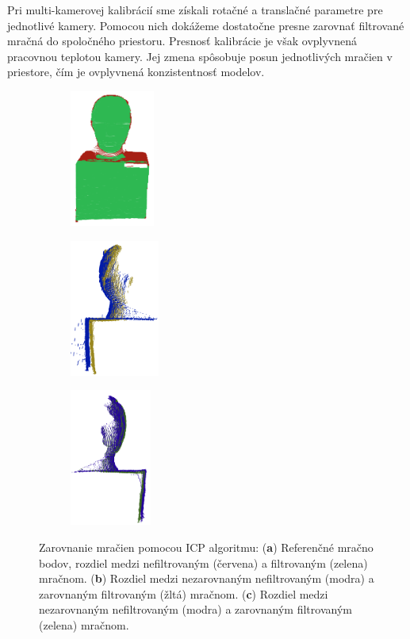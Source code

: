 Pri multi-kamerovej kalibrácií sme získali rotačné a translačné parametre pre jednotlivé kamery. Pomocou nich dokážeme dostatočne presne zarovnať filtrované mračná do spoločného priestoru. Presnosť kalibrácie je však ovplyvnená pracovnou teplotou kamery. Jej zmena spôsobuje posun jednotlivých mračien v priestore, čím je ovplyvnená konzistentnosť modelov.

\begin{figure}[h]
	\centering
	\begin{subfigure}[b]{0.32\textwidth}
		\centering
		\includegraphics[height=4.5cm]{figures/icp1.png}
		\caption{}
		\label{fig:icp:a}
	\end{subfigure}
	\hfill
	\begin{subfigure}[b]{0.32\textwidth}
		\centering
		\includegraphics[height=4.5cm]{figures/icp0.png}
		\caption{}
		\label{fig:icp:b}
	\end{subfigure}
	\hfill
	\begin{subfigure}[b]{0.32\textwidth}
		\centering
		\includegraphics[height=4.5cm]{figures/icp2.png}
		\caption{}
		\label{fig:icp:c}
	\end{subfigure}
	\caption{Zarovnanie mračien pomocou ICP algoritmu: (\textbf{a}) Referenčné mračno bodov, rozdiel medzi nefiltrovaným (červena) a filtrovaným (zelena) mračnom. (\textbf{b}) Rozdiel medzi nezarovnaným nefiltrovaným (modra) a zarovnaným filtrovaným (žltá) mračnom. (\textbf{c}) Rozdiel medzi nezarovnaným nefiltrovaným (modra) a zarovnaným filtrovaným (zelena) mračnom.}
	\label{fig:3dm}
\end{figure}

